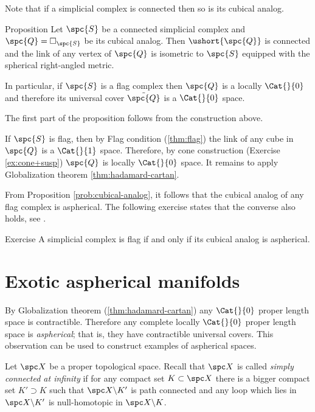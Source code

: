 Note that if a simplicial complex is connected then so is its cubical analog.

\begin{thm}{Proposition}\label{prob:cubical-analog}
Let $\spc{S}$ be a connected simplicial complex
and $\spc{Q}=\square_{\spc{S}}$ be its cubical analog.
Then $\ushort{\spc{Q}}$ is connected 
and the link of any vertex of $\spc{Q}$
is isometric to  ${\spc{S}}$
equipped with the spherical right-angled metric.

In particular, if $\spc{S}$ is a flag complex 
then $\spc{Q}$ is a locally $\Cat{}{0}$
and therefore its universal cover $\tilde{\spc{Q}}$ is a $\Cat{}{0}$ space.
\end{thm}

The first part of the proposition follows 
from the construction above.

If ${\spc{S}}$ is flag, 
then by Flag condition (\ref{thm:flag}) 
the link of any cube in $\spc{Q}$ is a $\Cat{}{1}$ space.
Therefore, by cone construction (Exercise \ref{ex:cone+susp})
$\spc{Q}$
is locally $\Cat{}{0}$ space.
It remains to apply Globalization theorem 
\ref{thm:hadamard-cartan}.
\qeds

From Proposition \ref{prob:cubical-analog}, 
it follows that the cubical analog
of any flag complex is aspherical.
The following exercise states that the  converse also holds, see \cite[5.4]{davis-survey}.

\begin{thm}{Exercise}\label{ex:flag-aspherical}
A simplicial complex is flag 
if and only if its cubical analog is aspherical.
\end{thm}

\section{Exotic aspherical manifolds}


By Globalization theorem (\ref{thm:hadamard-cartan})
any $\Cat{}{0}$ proper length space is contractible.
Therefore any complete locally $\Cat{}{0}$ proper length space 
is \emph{aspherical};
that is, they have contractible universal covers.
This observation can be used to construct examples of aspherical spaces. 

Let $\spc X$ be a proper topological space.
Recall that $\spc X$ is called 
\emph{simply connected at infinity} 
if for any compact set $K\subset\spc X$
there is a bigger compact set $K'\supset K$
such that  $\spc X\backslash K'$ is path connected 
and any loop which lies in $\spc X\backslash K'$
is null-homotopic in  $\spc X\backslash K$.

